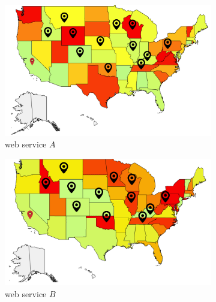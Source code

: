 \begin{figure}[!htb]
   \centering
   \begin{subfigure}{0.4\textwidth}
       \includegraphics[width=\textwidth]{pics/web1.png}
	   \caption{web service $A$}
   \end{subfigure}
   \begin{subfigure}{0.4\textwidth}
       \includegraphics[width=\textwidth]{pics/web2.png}
	   \caption{web service $B$}
   \end{subfigure}
   \caption{}
   \label{fig:users}
\end{figure}


